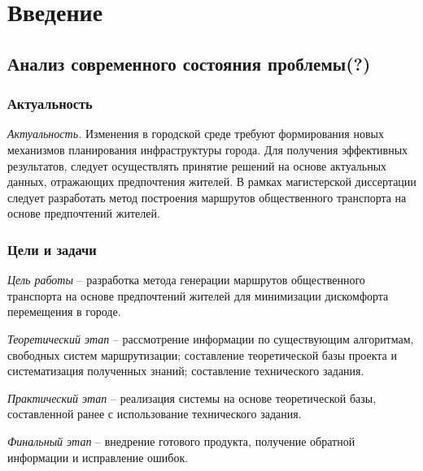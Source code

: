 \part{Введение}


\chapter{Анализ современного состояния проблемы(?)}
\section{Актуальность}
\emph{Актуальность.} Изменения в городской среде требуют формирования новых механизмов 
планирования инфраструктуры города. Для получения эффективных результатов, следует осуществлять 
принятие решений на основе актуальных данных, отражающих предпочтения жителей. В рамках 
магистерской диссертации следует разработать метод построения маршрутов общественного транспорта 
на основе предпочтений жителей.

\section{Цели и задачи}

\emph{Цель работы} -- разработка метода генерации маршрутов общественного транспорта на основе 
предпочтений жителей для минимизации дискомфорта перемещения в городе.

\emph{Теоретический этап} -- рассмотрение информации по существующим алгоритмам, свободных систем 
маршрутизации; составление теоретической базы проекта и систематизация полученных знаний; 
составление технического задания. 

\emph{Практический этап} -- реализация системы на основе теоретической базы, составленной ранее с 
использование технического задания.

\emph{Финальный этап} -- внедрение готового продукта, получение обратной информации и исправление 
ошибок.

